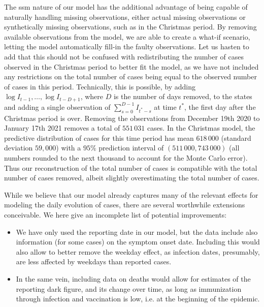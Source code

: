 The \acrshort{ssm} nature of our model has the additional advantage of being capable of naturally handling missing observations, either actual missing observations or synthetically missing observations, such as in the Christmas period. By removing available observations from the model, we are able to create a what-if scenario, letting the model automatically fill-in the faulty observations. Let us hasten to add that this should not be confused with redistributing the number of cases observed in the Christmas period to better fit the model, as we have not included any restrictions on the total number of cases being equal to the observed number of cases in this period. Technically, this is possible, by adding $\log I_{t - 1}, \dots, \log I_{t - D + 1}$, where $D$ is the number of days removed, to the states and adding a single observation of $\sum_{s = 0}^{D - 1} I_{t^{\ast} - s}$ at time $t^{\ast}$, the first day after the Christmas period is over. Removing the observations from December 19th 2020 to January 17th 2021 removes a total of $551\,031$ cases. In the Christmas model, the predictive distribution of cases for this time period has mean $618\,000$ (standard deviation $59,000$) with a $95\%$ prediction interval of $(511\,000, 743\,000)$ (all numbers rounded to the next thousand to account for the Monte Carlo error). Thus our reconstruction of the total number of cases is compatible with the total number of cases removed, albeit slightly overestimating the total number of cases.

While we believe that our model already captures many of the relevant effects for modeling the daily evolution of cases, there are several worthwhile extensions conceivable. We here give an incomplete list of potential improvements:
\begin{itemize}
    \item We have only used the reporting date in our model, but the data include also information (for some cases) on the symptom onset date. Including this would also allow to better remove the weekday effect, as infection dates, presumably, are less affected by weekdays than reported cases.
    \item In the same vein, including data on deaths would allow for estimates of the reporting dark figure, and its change over time, as long as immunization through infection and vaccination is low, i.e. at the beginning of the epidemic.
\end{itemize}

